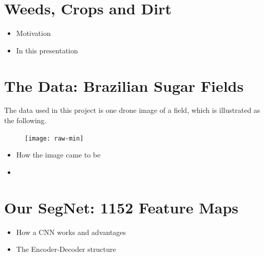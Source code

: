 \documentclass[
]{dtuposter}
\begin{document}
%
%
\begin{dtuposterhead} %
\end{dtuposterhead}
%
%
\begin{dtupostercontent}
\section{Weeds, Crops and Dirt}

\begin{itemize}
	\item Motivation
	
	\item In this presentation
\end{itemize}
 
\section{The Data: Brazilian Sugar Fields}
The data used in this project is one drone image of a field, which is illustrated as the following.
\begin{figure}
\centering
\texttt{[image: raw-min]}
\end{figure}
\begin{itemize}
	\item How the image came to be
	
	\item 
\end{itemize}


\section{Our SegNet: 1152 Feature Maps}
\begin{itemize}
	\item How a CNN works and advantages
	
	\item The Encoder-Decoder structure
\end{itemize}



\end{dtupostercontent}
\end{document}
